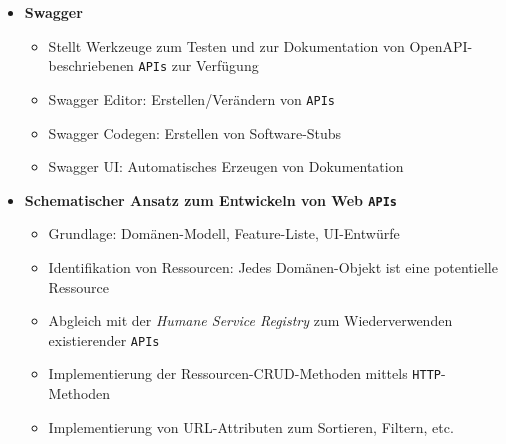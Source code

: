 \begin{itemize}
\begin{itemize}
\begin{description}
		\end{description}
	\end{itemize}
	\item \textbf{Swagger}
	\begin{itemize}
		\item Stellt Werkzeuge zum Testen und zur Dokumentation von OpenAPI-beschriebenen \texttt{APIs} zur Verfügung
		\item Swagger Editor: Erstellen/Verändern von \texttt{APIs}
		\item Swagger Codegen: Erstellen von Software-Stubs
		\item Swagger UI: Automatisches Erzeugen von Dokumentation
	\end{itemize}
	\item \textbf{Schematischer Ansatz zum Entwickeln von Web \texttt{APIs}}
	\begin{itemize}
		\item Grundlage: Domänen-Modell, Feature-Liste, UI-Entwürfe
		\item Identifikation von Ressourcen: Jedes Domänen-Objekt ist eine potentielle Ressource
		\item Abgleich mit der \textit{Humane Service Registry} zum Wiederverwenden existierender \texttt{APIs}
		\item Implementierung der Ressourcen-CRUD-Methoden mittels \texttt{HTTP}-Methoden
		\item Implementierung von URL-Attributen zum Sortieren, Filtern, etc.
	\end{itemize}
\end{itemize}


